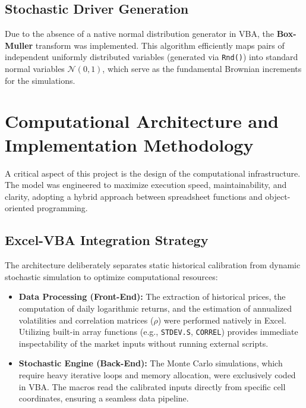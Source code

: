 \documentclass{report}
\begin{document}
\subsection{Stochastic Driver Generation}
Due to the absence of a native normal distribution generator in VBA, the \textbf{Box-Muller} transform was implemented. This algorithm efficiently maps pairs of independent uniformly distributed variables (generated via \texttt{Rnd()}) into standard normal variables $\mathcal{N}(0,1)$, which serve as the fundamental Brownian increments for the simulations.

\section{Computational Architecture and Implementation Methodology}
A critical aspect of this project is the design of the computational infrastructure. The model was engineered to maximize execution speed, maintainability, and clarity, adopting a hybrid approach between spreadsheet functions and object-oriented programming.

\subsection{Excel-VBA Integration Strategy}
The architecture deliberately separates static historical calibration from dynamic stochastic simulation to optimize computational resources:
\begin{itemize}
    \item \textbf{Data Processing (Front-End):} The extraction of historical prices, the computation of daily logarithmic returns, and the estimation of annualized volatilities and correlation matrices ($\rho$) were performed natively in Excel. Utilizing built-in array functions (e.g., \texttt{STDEV.S}, \texttt{CORREL}) provides immediate inspectability of the market inputs without running external scripts.
    \item \textbf{Stochastic Engine (Back-End):} The Monte Carlo simulations, which require heavy iterative loops and memory allocation, were exclusively coded in VBA. The macros read the calibrated inputs directly from specific cell coordinates, ensuring a seamless data pipeline.
\end{itemize}
\end{document}
